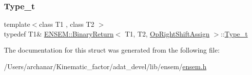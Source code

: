 \mbox{\label{structENSEM_1_1BinaryReturn_3_01T1_00_01T2_00_01OpRightShiftAssign_01_4_a26258e35d38645434ce665a2ece52c32}} 
\subsubsection{\texorpdfstring{Type\_t}{Type\_t}\hspace{0.1cm}{\footnotesize\ttfamily [2/2]}}
{\footnotesize\ttfamily template$<$class T1 , class T2 $>$ \\
typedef T1\& \mbox{\hyperlink{structENSEM_1_1BinaryReturn}{E\+N\+S\+E\+M\+::\+Binary\+Return}}$<$ T1, T2, \mbox{\hyperlink{structENSEM_1_1OpRightShiftAssign}{Op\+Right\+Shift\+Assign}} $>$\+::\mbox{\hyperlink{structENSEM_1_1BinaryReturn_3_01T1_00_01T2_00_01OpRightShiftAssign_01_4_a26258e35d38645434ce665a2ece52c32}{Type\+\_\+t}}}



The documentation for this struct was generated from the following file\+:\begin{DoxyCompactItemize}
\item 
/\+Users/archanar/\+Kinematic\+\_\+factor/adat\+\_\+devel/lib/ensem/\mbox{\hyperlink{lib_2ensem_2ensem_8h}{ensem.\+h}}\end{DoxyCompactItemize}
